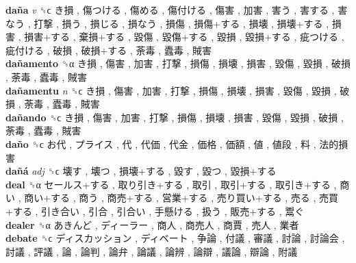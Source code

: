 \textbf{daña} \emph{v}  ␝ϲ   き損 ,  傷つける ,  傷める ,  傷付ける ,  傷害 ,  加害 ,  害う ,  害する ,  害なう ,  打撃 ,  損う ,  損じる ,  損なう ,  損傷 ,  損傷+する ,  損壊 ,  損壊+する ,  損害 ,  損害+する ,  棄損+する ,  毀傷 ,  毀傷+する ,  毀損 ,  毀損+する ,  疵つける ,  疵付ける ,  破損 ,  破損+する ,  荼毒 ,  蠹毒 ,  賊害   \\
\textbf{dañamento} ␝α   き損 ,  傷害 ,  加害 ,  打撃 ,  損傷 ,  損壊 ,  損害 ,  毀傷 ,  毀損 ,  破損 ,  荼毒 ,  蠹毒 ,  賊害   \\
\textbf{dañamentu} \emph{n}  ␝ϲ   き損 ,  傷害 ,  加害 ,  打撃 ,  損傷 ,  損壊 ,  損害 ,  毀傷 ,  毀損 ,  破損 ,  荼毒 ,  蠹毒 ,  賊害   \\
\textbf{dañando} ␝ϲ   き損 ,  傷害 ,  加害 ,  打撃 ,  損傷 ,  損壊 ,  損害 ,  毀傷 ,  毀損 ,  破損 ,  荼毒 ,  蠹毒 ,  賊害   \\
\textbf{daño} ␝ϲ   お代 ,  プライス ,  代 ,  代価 ,  代金 ,  価格 ,  価額 ,  値 ,  値段 ,  料 ,  法的損害   \\
\textbf{dañá} \emph{adj}  ␝ϲ   壊す ,  壊つ ,  損壊+する ,  毀す ,  毀つ ,  毀損+する   \\
\textbf{deal} ␝α   セールス+する ,  取り引き+する ,  取引 ,  取引+する ,  取引き+する ,  商い ,  商い+する ,  商う ,  商売+する ,  営業+する ,  売り買い+する ,  売る ,  売買+する ,  引き合い ,  引合 ,  引合い ,  手懸ける ,  扱う ,  販売+する ,  鬻ぐ   \\
\textbf{dealer} ␝α   あきんど ,  ディーラー ,  商人 ,  商売人 ,  商賈 ,  売人 ,  業者   \\
\textbf{debate} ␝ϲ   ディスカッション ,  ディベート ,  争論 ,  付議 ,  審議 ,  討論 ,  討論会 ,  討議 ,  評議 ,  論 ,  論判 ,  論弁 ,  論議 ,  論辨 ,  論辯 ,  議論 ,  辯論 ,  附議   \\
